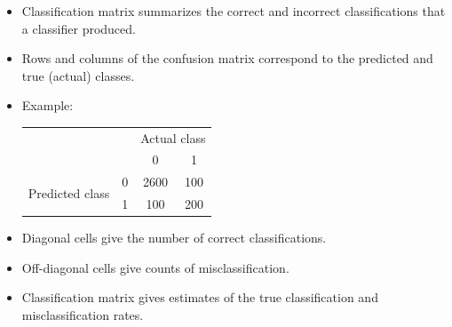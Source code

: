 \documentclass[compress]{beamer}
\begin{document}
%	
%	
%	
%	



\begin{frame}
	\frametitle{}
	\begin{itemize}
  \item Classification matrix summarizes the correct and incorrect classifications
that a classifier produced.
  \item Rows and columns
of the confusion matrix correspond to the predicted and true (actual) classes.
\item Example:\\[-2mm]
\begin{tabular}{cccc}

 &  & \multicolumn{2}{|l}{Actual class} \\
  & & \multicolumn{1}{|c}{0} & 1 \\\hline
\multirow{2}{*}{Predicted class} & 0 & \multicolumn{1}{|c}{2600} & 100 \\
 & 1 & \multicolumn{1}{|c}{100} & 200 \\
\end{tabular}
\item Diagonal cells give the number of
correct classifications.
\item Off-diagonal cells give counts of misclassification.
\item Classification matrix gives estimates of the true classification and misclassification
rates.
\end{itemize}
\end{frame}
\end{document}
